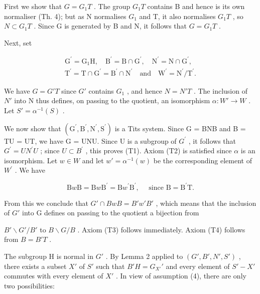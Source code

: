 First we show that \(G = G_{1}T\) . The group \(G_{1}T\) contains B and hence is its own normaliser (Th. 4); but as N normalises \(G_{1}\) and T, it also normalises \(G_{1}T\) , so \(N \subset G_{1}T\) . Since G is generated by B and N, it follows that \(G = G_{1}T\) .

Next, set

\[
\begin{array}{c} \mathrm{G} ^ {\prime} = \mathrm{G} _ {1} \mathrm{H}, \quad \mathrm{B} ^ {\prime} = \mathrm{B} \cap \mathrm{G} ^ {\prime}, \quad \mathrm{N} ^ {\prime} = \mathrm{N} \cap \mathrm{G} ^ {\prime}, \\ \mathrm{T} ^ {\prime} = \mathrm{T} \cap \mathrm{G} ^ {\prime} = \mathrm{B} ^ {\prime} \cap \mathrm{N} ^ {\prime} \quad \text {and} \quad \mathrm{W} ^ {\prime} = \mathrm{N} ^ {\prime} / \mathrm{T} ^ {\prime}. \end{array}
\]

We have \(G = G'T\) since \(G'\) contains \(G_{1}\) , and hence \(N = N'T\) . The inclusion of \(N'\) into N thus defines, on passing to the quotient, an isomorphism \(\alpha : W' \to W\) . Let \(S' = \alpha^{-1}(S)\) .

We now show that \((\mathrm{G}^{\prime},\mathrm{B}^{\prime},\mathrm{N}^{\prime},\mathrm{S}^{\prime})\) is a Tits system. Since G = BNB and B = TU = UT, we have G = UNU. Since U is a subgroup of \(G^{\prime}\) , it follows that \(G^{\prime} = UN^{\prime}U\) ; since \(U \subset B^{\prime}\) , this proves (T1). Axiom (T2) is satisfied since \(\alpha\) is an isomorphism. Let \(w \in W\) and let \(w' = \alpha^{-1}(w)\) be the corresponding element of \(W^{\prime}\) . We have

\[
\mathrm{B} w \mathrm{B} = \mathrm{B} w \mathrm{B} ^ {\prime} = \mathrm{B} w ^ {\prime} \mathrm{B} ^ {\prime}, \quad \text { since } \mathrm{B} = \mathrm{B} ^ {\prime} \mathrm{T}.
\]

From this we conclude that \(G' \cap BwB = B'w'B'\) , which means that the inclusion of \(G'\) into G defines on passing to the quotient a bijection from

\(B'\backslash G'/B'\) to \(B\backslash G/B\) . Axiom (T3) follows immediately. Axiom (T4) follows from \(B = B'T\) .

The subgroup H is normal in \(G'\) . By Lemma 2 applied to \((G', B', N', S')\) , there exists a subset \(X'\) of \(S'\) such that \(B'H = G_{X'}'\) and every element of \(S' - X'\) commutes with every element of \(X'\) . In view of assumption (4), there are only two possibilities:

